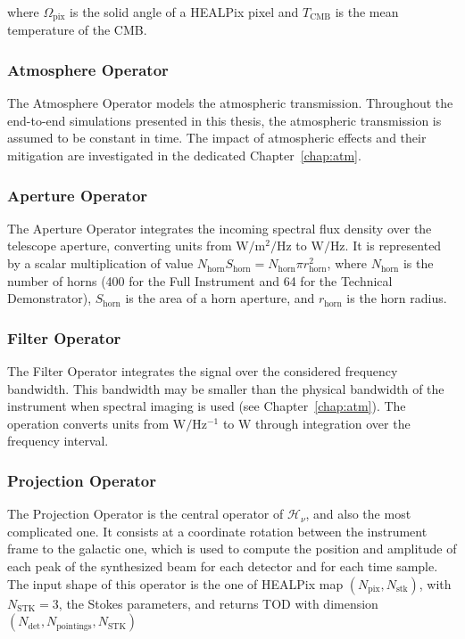 \documentclass[../../thesis.tex]{subfiles}
\begin{document}
where $\Omega_{\mathrm{pix}}$ is the solid angle of a HEALPix pixel and $T_{\mathrm{CMB}}$ is the mean temperature of the CMB.

\subsubsection{Atmosphere Operator}

The Atmosphere Operator models the atmospheric transmission. Throughout the end-to-end simulations presented in this thesis, the atmospheric transmission is assumed to be constant in time. The impact of atmospheric effects and their mitigation are investigated in the dedicated Chapter~\ref{chap:atm}.

\subsubsection{Aperture Operator}

The Aperture Operator integrates the incoming spectral flux density over the telescope aperture, converting units from $\text{W}/\text{m}^2/\text{Hz}$ to $\text{W}/\text{Hz}$. It is represented by a scalar multiplication of value $N_{\text{horn}}S_{\text{horn}} = N_{\text{horn}}\pi r_{\text{horn}}^2$, where $N_{\text{horn}}$ is the number of horns (400 for the Full Instrument and 64 for the Technical Demonstrator), $S_{\mathrm{horn}}$ is the area of a horn aperture, and $r_{\mathrm{horn}}$ is the horn radius.

\subsubsection{Filter Operator}

The Filter Operator integrates the signal over the considered frequency bandwidth. This bandwidth may be smaller than the physical bandwidth of the instrument when spectral imaging is used (see Chapter~\ref{chap:atm}). The operation converts units from $\mathrm{W/Hz^{-1}}$ to $\mathrm{W}$ through integration over the frequency interval.

\subsubsection{Projection Operator}

The Projection Operator is the central operator of $\mathcal{H}_{\nu}$, and also the most complicated one. It consists at a coordinate rotation between the instrument frame to the galactic one, which is used to compute the position and amplitude of each peak of the synthesized beam for each detector and for each time sample. The input shape of this operator is the one of HEALPix map $\left(N_{\text{pix}}, N_{\text{stk}}\right)$, with $N_{\text{STK}}=3$, the Stokes parameters, and returns TOD with dimension $\left(N_{\text{det}}, N_{\text{pointings}}, N_{\text{STK}}\right)$
\end{document}
